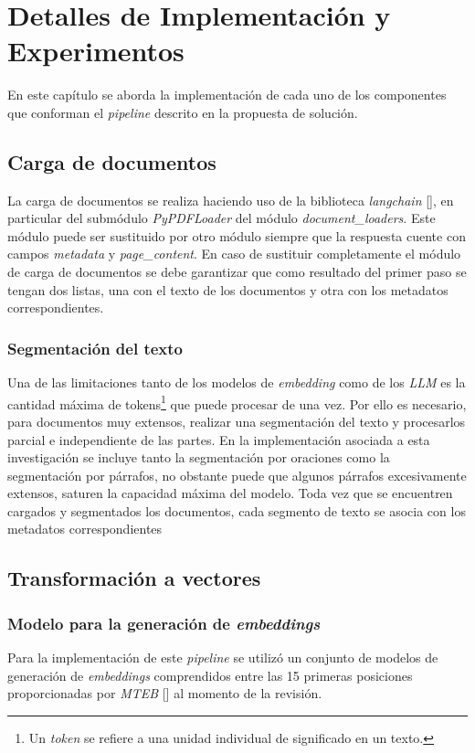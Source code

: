 \chapter{Detalles de Implementación y Experimentos}\label{chapter:implementation}
En este capítulo se aborda la implementación de cada uno de los componentes que conforman el \emph{pipeline}
descrito en la propuesta de solución.

\section{Carga de documentos}
La carga de documentos se realiza haciendo uso de la biblioteca \emph{langchain} [\cite{langchain}],
en particular del submódulo \emph{PyPDFLoader} del módulo \emph{document\_loaders}. Este módulo puede ser sustituido por otro módulo siempre que la respuesta cuente con campos \emph{metadata} y \emph{page\_content}. En caso de sustituir completamente el módulo de carga de documentos se debe garantizar que como resultado del primer paso se tengan dos listas, una con el texto de los documentos y otra con los metadatos correspondientes.
    \subsection{Segmentación del texto}
        Una de las limitaciones tanto de los modelos de \emph{embedding} como de los \emph{LLM} es la cantidad máxima de tokens\footnote{Un \emph{token} se refiere a una unidad individual de significado en un texto.} que puede procesar de una vez. Por ello es necesario, para documentos muy extensos, realizar una segmentación del texto y procesarlos parcial e independiente de las partes.
        En la implementación asociada a esta investigación se incluye tanto la segmentación por oraciones como la segmentación por párrafos, no obstante puede que algunos párrafos excesivamente extensos, saturen la capacidad máxima del modelo. Toda vez que se encuentren cargados y segmentados los documentos, cada segmento de texto se asocia con los metadatos correspondientes

\section{Transformación a vectores}
    \subsection{Modelo para la generación de \emph{embeddings}}
        Para la implementación de este \emph{pipeline} se utilizó un conjunto de modelos de generación de \emph{embeddings} comprendidos entre las 15 primeras posiciones proporcionadas por \emph{MTEB} [\cite{leaderboard}] al momento de la revisión.

